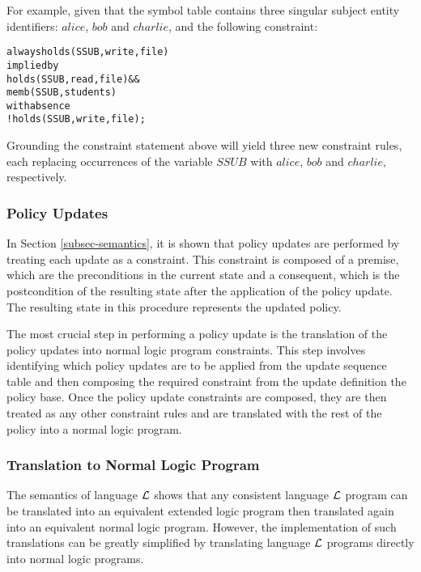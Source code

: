 \documentclass[global,twocolumn,final]{svjour}
\newenvironment{vverbatim}
  {\begin{alltt}}
  {\vspace{-\baselineskip}\end{alltt}}
\begin{document}
        For example, given that the symbol table contains three singular
        subject entity identifiers: $alice$, $bob$ and $charlie$, and the
        following constraint:

        \begin{vverbatim}
  always holds(SSUB, write, file)
    implied by
      holds(SSUB, read, file) &&
      memb(SSUB, students)
    with absence
      !holds(SSUB, write, file);
        \end{vverbatim}

        Grounding the constraint statement above will yield three new
        constraint rules, each replacing occurrences of the variable $SSUB$
        with $alice$, $bob$ and $charlie$, respectively.

      \subsubsection{Policy Updates}

        In Section \ref{subsec-semantics}, it is shown that policy updates are
        performed by treating each update as a constraint. This constraint is
        composed of a premise, which are the preconditions in the current state
        and a consequent, which is the postcondition of the resulting state
        after the application of the policy update. The resulting state in this
        procedure represents the updated policy.

        The most crucial step in performing a policy update is the translation
        of the policy updates into normal logic program constraints. This step
        involves identifying which policy updates are to be applied from the
        update sequence table and then composing the required constraint from
        the update definition the policy base. Once the policy update
        constraints are composed, they are then treated as any other
        constraint rules and are translated with the rest of the policy into
        a normal logic program.

      \subsubsection{Translation to Normal Logic Program}

        The semantics of language ${\cal L}$ shows that any consistent language
        ${\cal L}$ program can be translated into an equivalent extended logic
        program then translated again into an equivalent normal logic program.
        However, the implementation of such translations can be greatly
        simplified by translating language ${\cal L}$ programs directly into
        normal logic programs.
\end{document}
